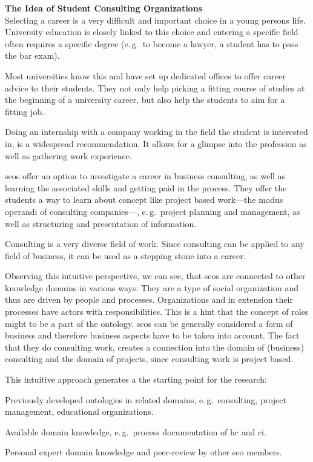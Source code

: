 \documentclass[a4paper, DIV=13, BCOR=0cm]{scrbook}
\newcommand{\eg}{e.\,g.\ }
\begin{document}
\begin{mdframed}
	\textbf{The Idea of Student Consulting Organizations}\\
	Selecting a career is a very difficult and important choice in a young persons life. University education is closely linked to this choice and entering a specific field often requires a specific degree (\eg to become a lawyer, a student has to pass the bar exam).

	Most universities know this and have set up dedicated offices to offer career advice to their students. They not only help picking a fitting course of studies at the beginning of a university career, but also help the students to aim for a fitting job.

	Doing an internship with a company working in the field the student is interested in, is a widespread recommendation. It allows for a glimpse into the profession as well as gathering work experience.

	\glspl{sco} offer an option to investigate a career in business consulting, as well as learning the associated skills and getting paid in the process. They offer the students a way to learn about concept like project based work---the modus operandi of consulting companies---, \eg project planning and management, as well as structuring and presentation of information.

	Consulting is a very diverse field of work. Since consulting can be applied to any field of business, it can be used as a stepping stone into a career.
\end{mdframed}

Observing this intuitive perspective, we can see, that \glspl{sco} are connected to other knowledge domains in various ways: They are a type of social organization and thus are driven by people and processes. Organizations and in extension their processes have actors with responsibilities. This is a hint that the concept of roles might to be a part of the ontology. \glspl{sco} can be generally considered a form of business and therefore business aspects have to be taken into account. The fact that they do consulting work, creates a connection into the domain of (business) consulting and the domain of projects, since consulting work is project based.

This intuitive approach generates a the starting point for the research:
\begin{compactitem}
	\item Previously developed ontologies in related domains, \eg consulting, project management, educational organizations.
	\item Available domain knowledge, \eg process documentation of \gls{hc} and \gls{ci}.
	\item Personal expert domain knowledge and peer-review by other \gls{sco} members.
\end{compactitem}
\end{document}

